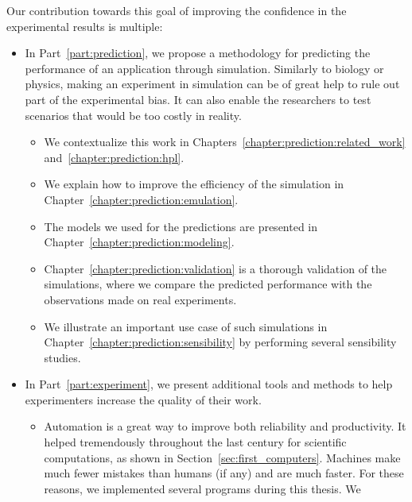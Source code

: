         Our contribution towards this goal of improving the confidence in the experimental results is multiple:
        \begin{itemize}
            \item In Part~\ref{part:prediction}, we propose a methodology for predicting the performance of an
                application through simulation. Similarly to biology or physics, making an experiment in simulation
                can be of great help to rule out part of the experimental bias. It can also enable the researchers to
                test scenarios that would be too costly in reality.
                \begin{itemize}
                    \item We contextualize this work in Chapters~\ref{chapter:prediction:related_work}
                        and~\ref{chapter:prediction:hpl}.
                    \item We explain how to improve the efficiency of the simulation in
                        Chapter~\ref{chapter:prediction:emulation}.
                    \item The models we used for the predictions are presented in
                        Chapter~\ref{chapter:prediction:modeling}.
                    \item Chapter~\ref{chapter:prediction:validation} is a thorough validation of the simulations, where
                        we compare the predicted performance with the observations made on real experiments.
                    \item We illustrate an important use case of such simulations in
                        Chapter~\ref{chapter:prediction:sensibility} by performing several sensibility studies.
                \end{itemize}
            \item In Part~\ref{part:experiment}, we present additional tools and methods to help experimenters increase
                the quality of their work.
                \begin{itemize}
                    \item Automation is a great way to improve both reliability and productivity. It helped tremendously
                        throughout the last century for scientific computations, as shown in
                        Section~\ref{sec:first_computers}. Machines make much fewer mistakes than humans (if any) and
                        are much faster. For these reasons, we implemented several programs during this thesis. We

\end{itemize}
\end{itemize}

